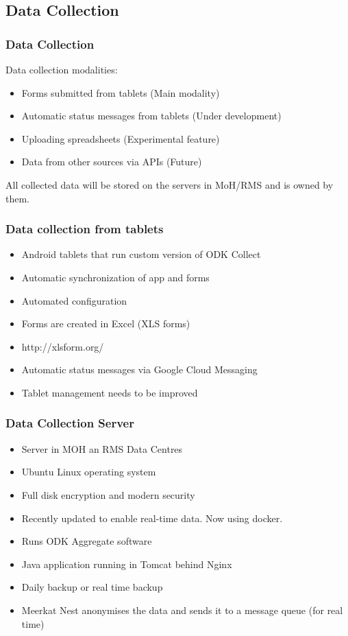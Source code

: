 \documentclass{beamer}
\begin{document}
\subsection{Data Collection}

\begin{frame}
  \frametitle{Data Collection}
  Data collection modalities:
  \begin{itemize}
  \item Forms submitted from tablets (Main modality)
  \item Automatic status messages from tablets (Under development)
  \item Uploading spreadsheets (Experimental feature)
  \item Data from other sources via APIs (Future)
  \end{itemize}

  \vspace{10pt}
  All collected data will be stored on the servers in MoH/RMS and is owned by them. 
\end{frame}


\begin{frame}
  \frametitle{Data collection from tablets}
  \begin{itemize}
  \item Android tablets that run custom version of ODK Collect
  \item Automatic synchronization of app and forms
  \item Automated configuration
  \item Forms are created in Excel (XLS forms)
  \item http://xlsform.org/
  \item Automatic status messages via Google Cloud Messaging
  \item Tablet management needs to be improved
  \end{itemize}
\end{frame}
\begin{frame}
  \frametitle{Data Collection Server}
  \begin{itemize}
  \item Server in MOH an RMS Data Centres
  \item Ubuntu Linux operating system
  \item Full disk encryption and modern security
  \item Recently updated to enable real-time data. Now using docker.
  \item Runs ODK Aggregate software
  \item Java application running in Tomcat behind Nginx
  \item Daily backup or real time backup
  \item Meerkat Nest anonymises the data and sends it to a message queue (for real time)  
  \end{itemize}
\end{frame}
\end{document}
